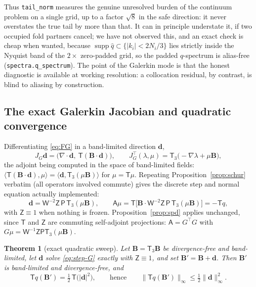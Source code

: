 \documentclass[11pt]{article}
\newtheorem{theorem}{Theorem}[section]
\theoremstyle{definition}
\newcommand{\B}{\mathbf{B}}
\newcommand{\dd}{\mathbf{d}}
\newcommand{\Tr}{\mathsf{T}}
\newcommand{\Trr}{\mathsf{T}_3}
\newcommand{\Pl}{\mathsf{P}}
\newcommand{\Wm}{\mathsf{W}}
\newcommand{\Zf}{\mathsf{Z}}
\newcommand{\Aop}{\mathsf{A}}
\newcommand{\supp}{\operatorname{supp}}
\begin{document}
Thus \texttt{tail\_norm} measures the genuine unresolved burden of the
continuum problem on a single grid, up to a factor $\sqrt8$ in the safe
direction: it never overstates the true tail by more than that. It can in
principle understate it, if two occupied fold partners cancel; we have not
observed this, and an exact check is cheap when wanted, because
$\supp\hat q\subset\{|k_i|<2N_i/3\}$ lies strictly inside the Nyquist band of
the $2\times$ zero-padded grid, so the padded $q$-spectrum is alias-free
(\texttt{spectra.q\_spectrum}). The point of the Galerkin mode is that the
honest diagnostic is available at working resolution: a collocation residual,
by contrast, is blind to aliasing by construction.

\subsection{The exact Galerkin Jacobian and quadratic convergence}

Differentiating \eqref{eq:FG} in a band-limited direction $\dd$,
\begin{equation}\label{eq:JG}
J_G\dd=\bigl(\nabla\cdot\dd,\ \Tr(\B\cdot\dd)\bigr),
\qquad
J_G^{\!\top}(\lambda,\mu)=\Trr\bigl(-\nabla\lambda+\mu\B\bigr),
\end{equation}
the adjoint being computed in the space of band-limited fields:
$\langle\Tr(\B\cdot\dd),\mu\rangle=\langle\dd,\Trr(\mu\B)\rangle$ for
$\mu=\Tr\mu$. Repeating Proposition~\ref{prop:schur} verbatim (all operators
involved commute) gives the discrete step and normal equation actually
implemented:
\begin{equation}\label{eq:step-G}
\dd=\Wm^{-2}\Zf\,\Pl\,\Trr(\mu\B),
\qquad
\Aop\mu=\Tr\bigl[\B\cdot\Wm^{-2}\Zf\,\Pl\,\Trr(\mu\B)\bigr]=-\Tr q ,
\end{equation}
with $\Zf\equiv1$ when nothing is frozen. Proposition~\ref{prop:spd} applies
unchanged, since $\Tr$ and $\Zf$ are commuting self-adjoint projections:
$\Aop=G^{\!\top}G$ with $G\mu=\Wm^{-1}\Zf\Pl\Trr(\mu\B)$.

\begin{theorem}[exact quadratic sweep]\label{thm:quad}
Let $\B=\Trr\B$ be divergence-free and band-limited, let $\dd$ solve
\eqref{eq:step-G} exactly with $\Zf\equiv1$, and set $\B'=\B+\dd$. Then
$\B'$ is band-limited and divergence-free, and
\begin{equation}\label{eq:quad}
\Tr q(\B')=\tfrac12\,\Tr\bigl(|\dd|^2\bigr),
\qquad\text{hence}\qquad
\bigl\|\Tr q(\B')\bigr\|_\infty\le\tfrac12\|\dd\|_\infty^2 .
\end{equation}
\end{theorem}
\end{document}
